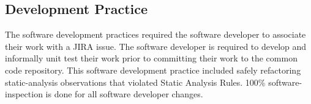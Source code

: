 \subsection{Development Practice}
The software development practices required the software developer to associate
their work with a JIRA issue. The software developer is required to develop and
informally unit test their work prior to committing their work to the common
code repository. This software development practice included safely refactoring
\gls{static-analysis} observations that violated Static Analysis Rules. 100\%
\gls{software-inspection} is done for all software developer changes.

